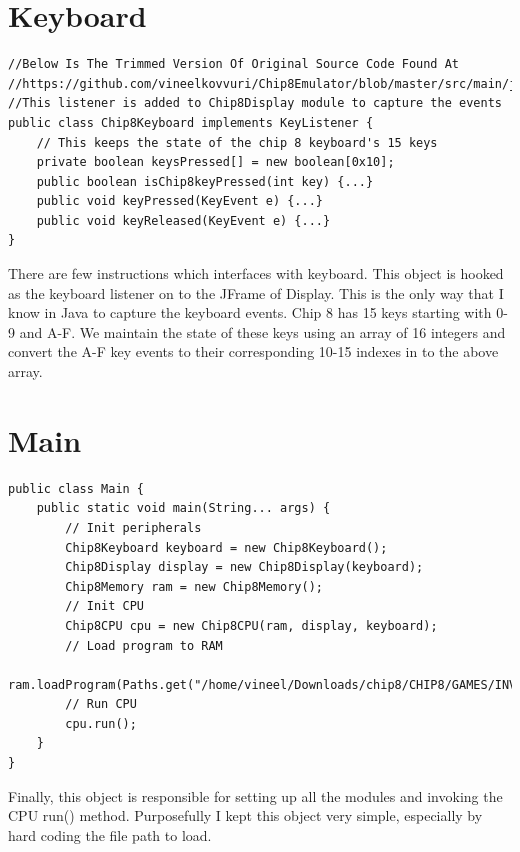 \documentclass{article}
\begin{document}
\section{Keyboard}
\begin{verbatim}
//Below Is The Trimmed Version Of Original Source Code Found At
//https://github.com/vineelkovvuri/Chip8Emulator/blob/master/src/main/java/com/vineelkumarreddy/chip8/Chip8Keyboard.java
//This listener is added to Chip8Display module to capture the events
public class Chip8Keyboard implements KeyListener {
    // This keeps the state of the chip 8 keyboard's 15 keys
    private boolean keysPressed[] = new boolean[0x10];
    public boolean isChip8keyPressed(int key) {...}
    public void keyPressed(KeyEvent e) {...}
    public void keyReleased(KeyEvent e) {...}
}
\end{verbatim}
There are few instructions which interfaces with keyboard. This object is hooked as the keyboard listener on to the JFrame of Display. This is the only way that I know in Java to capture the keyboard events. Chip 8 has 15 keys starting with 0-9 and A-F. We maintain the state of these keys using an array of 16 integers and convert the A-F key events to their corresponding 10-15 indexes in to the above array.
\section{Main}
\begin{verbatim}
public class Main {
    public static void main(String... args) {
        // Init peripherals
        Chip8Keyboard keyboard = new Chip8Keyboard();
        Chip8Display display = new Chip8Display(keyboard);
        Chip8Memory ram = new Chip8Memory();
        // Init CPU
        Chip8CPU cpu = new Chip8CPU(ram, display, keyboard);
        // Load program to RAM
        ram.loadProgram(Paths.get("/home/vineel/Downloads/chip8/CHIP8/GAMES/INVADERS"));
        // Run CPU
        cpu.run();
    }
}
\end{verbatim}
Finally, this object is responsible for setting up all the modules and invoking the CPU run() method. Purposefully I kept this object very simple, especially by hard coding the file path to load.
\end{document}
